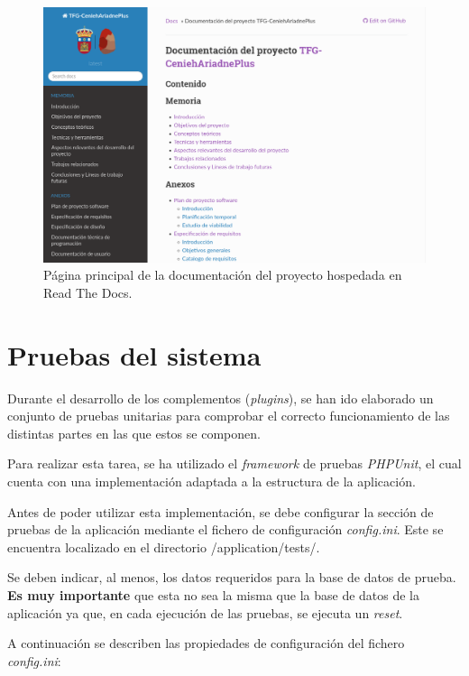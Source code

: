 \documentclass[
]{article}
\begin{document}
\begin{figure}
\hypertarget{docs-rtd}{%
\centering
\includegraphics{../_static/images/docs-rtd.png}
\caption{Página principal de la documentación del proyecto hospedada en
Read The Docs.}\label{docs-rtd}
}
\end{figure}

\hypertarget{pruebas-del-sistema}{%
\section{Pruebas del sistema}\label{pruebas-del-sistema}}

Durante el desarrollo de los complementos (\emph{plugins}), se han ido
elaborado un conjunto de pruebas unitarias para comprobar el correcto
funcionamiento de las distintas partes en las que estos se componen.

Para realizar esta tarea, se ha utilizado el \emph{framework} de pruebas
\emph{PHPUnit}, el cual cuenta con una implementación adaptada a la
estructura de la aplicación.

Antes de poder utilizar esta implementación, se debe configurar la
sección de pruebas de la aplicación mediante el fichero de configuración
\emph{config.ini}. Este se encuentra localizado en el directorio
{/application/tests/}.

Se deben indicar, al menos, los datos requeridos para la base de datos
de prueba. \textbf{Es muy importante} que esta no sea la misma que la
base de datos de la aplicación ya que, en cada ejecución de las pruebas,
se ejecuta un \emph{reset}.

A continuación se describen las propiedades de configuración del fichero
\emph{config.ini}:
\end{document}
